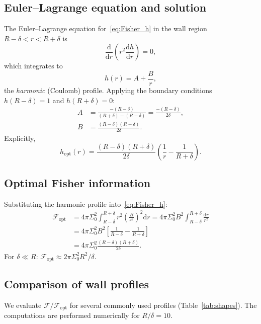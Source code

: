 \documentclass[prd,twocolumn,superscriptaddress,longbibliography]{revtex4-2}
\newcommand{\Fisher}{\mathcal{F}}
\newcommand{\dd}{\mathrm{d}}
\begin{document}
\subsection{Euler--Lagrange equation and solution}

The Euler--Lagrange equation for~\eqref{eq:Fisher_h} in the
wall region $R - \delta < r < R + \delta$ is
\begin{equation}
\frac{\dd}{\dd r}\!\left(r^2 \frac{\dd h}{\dd r}\right) = 0,
\end{equation}
which integrates to
\begin{equation}
\label{eq:harmonic_profile}
h(r) = A + \frac{B}{r},
\end{equation}
the \emph{harmonic} (Coulomb) profile.  Applying the boundary
conditions $h(R - \delta) = 1$ and $h(R + \delta) = 0$:
\begin{align}
A &= \frac{-(R-\delta)}{(R+\delta) - (R-\delta)}
= \frac{-(R-\delta)}{2\delta},
\nonumber\\
B &= \frac{(R-\delta)(R+\delta)}{2\delta}.
\end{align}
Explicitly,
\begin{equation}
h_{\mathrm{opt}}(r) =
\frac{(R-\delta)(R+\delta)}{2\delta}
\left(\frac{1}{r} - \frac{1}{R+\delta}\right).
\end{equation}

\subsection{Optimal Fisher information}

Substituting the harmonic profile into~\eqref{eq:Fisher_h}:
\begin{align}
\Fisher_{\mathrm{opt}} &= 4\pi\Sigma_0^2
\int_{R-\delta}^{R+\delta} r^2
\left(\frac{B}{r^2}\right)^{\!2}\dd r
= 4\pi\Sigma_0^2 B^2
\int_{R-\delta}^{R+\delta}\frac{\dd r}{r^2}
\nonumber\\
&= 4\pi\Sigma_0^2 B^2
\left[\frac{1}{R-\delta} - \frac{1}{R+\delta}\right]
\nonumber\\
&= 4\pi\Sigma_0^2
\frac{(R-\delta)(R+\delta)}{2\delta}.
\label{eq:Fisher_opt}
\end{align}
For $\delta \ll R$:
$\Fisher_{\mathrm{opt}} \approx 2\pi\Sigma_0^2 R^2/\delta$.

\subsection{Comparison of wall profiles}

We evaluate $\Fisher/\Fisher_{\mathrm{opt}}$ for several commonly
used profiles (Table~\ref{tab:shapes}).  The computations are
performed numerically for $R/\delta = 10$.
\end{document}
